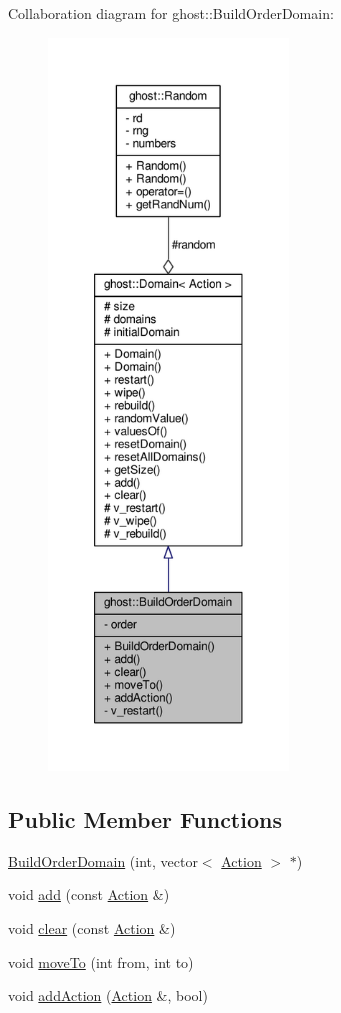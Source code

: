 Collaboration diagram for ghost\-:\-:Build\-Order\-Domain\-:\nopagebreak
\begin{figure}[H]
\begin{center}
\leavevmode
\includegraphics[height=550pt]{classghost_1_1BuildOrderDomain__coll__graph}
\end{center}
\end{figure}
\subsection*{Public Member Functions}
\begin{DoxyCompactItemize}
\item 
\hyperlink{classghost_1_1BuildOrderDomain_ac09e92262d5c39c75dd0164fb938fabc}{Build\-Order\-Domain} (int, vector$<$ \hyperlink{classghost_1_1Action}{Action} $>$ $\ast$)
\item 
void \hyperlink{classghost_1_1BuildOrderDomain_a7019f574fc926bca2c03c7910f23e165}{add} (const \hyperlink{classghost_1_1Action}{Action} \&)
\item 
void \hyperlink{classghost_1_1BuildOrderDomain_ab18f42adf6e2eddea3142ae8fdc8c951}{clear} (const \hyperlink{classghost_1_1Action}{Action} \&)
\item 
void \hyperlink{classghost_1_1BuildOrderDomain_ad258d2c26e415388b9e42a02ecbadb06}{move\-To} (int from, int to)
\item 
void \hyperlink{classghost_1_1BuildOrderDomain_a9747d6078687ebed2487fad646fd61a8}{add\-Action} (\hyperlink{classghost_1_1Action}{Action} \&, bool)
\end{DoxyCompactItemize}
